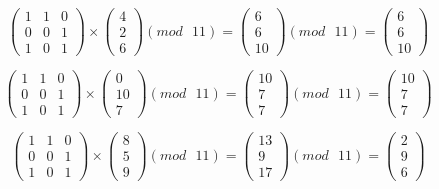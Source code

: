 \documentclass[a5paper, 10pt]{article}
\theoremstyle{definition}
\theoremstyle{plain}
\theoremstyle{remark}
\begin{document}
\begin{equation}
\begin{pmatrix}
 1 & 1 & 0 \\
0 & 0 & 1\\
1 & 0 & 1
\end{pmatrix}
 \times
\begin{pmatrix}
 4\\
2\\
6
\end{pmatrix}
(mod \text{ }11)
= 
\begin{pmatrix}
 6\\
6\\
10
\end{pmatrix}
(mod \text{ }11)
= \begin{pmatrix}
6 \\
6\\
10
\end{pmatrix}
\end{equation}

\begin{equation}
\begin{pmatrix}
 1 & 1 & 0 \\
0 & 0 & 1\\
1 & 0 & 1
\end{pmatrix}
 \times
\begin{pmatrix}
 0\\
10\\
7
\end{pmatrix}
(mod \text{ }11)
= 
\begin{pmatrix}
 10\\
7\\
7
\end{pmatrix}
(mod \text{ }11)
= \begin{pmatrix}
10 \\
7\\
7
\end{pmatrix}
\end{equation}

\begin{equation}
\begin{pmatrix}
 1 & 1 & 0 \\
0 & 0 & 1\\
1 & 0 & 1
\end{pmatrix}
 \times
\begin{pmatrix}
 8\\
5\\
9
\end{pmatrix}
(mod \text{ }11)
= 
\begin{pmatrix}
 13\\
9\\
17
\end{pmatrix}
(mod \text{ }11)
= \begin{pmatrix}
2 \\
9\\
6
\end{pmatrix}
\end{equation}
\end{document}
